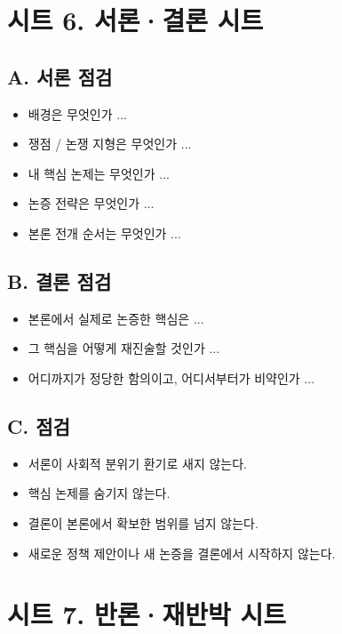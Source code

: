 \section{시트 6. 서론·결론 시트}\label{uxc2dcuxd2b8-6-uxc11cuxb860uxacb0uxb860-uxc2dcuxd2b8}

\subsection{A. 서론 점검}\label{a-uxc11cuxb860-uxc810uxac80}

\begin{itemize}
\tightlist
\item
  배경은 무엇인가 ...
\item
  쟁점 / 논쟁 지형은 무엇인가 ...
\item
  내 핵심 논제는 무엇인가 ...
\item
  논증 전략은 무엇인가 ...
\item
  본론 전개 순서는 무엇인가 ...
\end{itemize}

\subsection{B. 결론 점검}\label{b-uxacb0uxb860-uxc810uxac80}

\begin{itemize}
\tightlist
\item
  본론에서 실제로 논증한 핵심은 ...
\item
  그 핵심을 어떻게 재진술할 것인가 ...
\item
  어디까지가 정당한 함의이고, 어디서부터가 비약인가 ...
\end{itemize}

\subsection{C. 점검}\label{c-uxc810uxac80-1}

\begin{itemize}
\tightlist
\item[$\square$]
  서론이 사회적 분위기 환기로 새지 않는다.
\item[$\square$]
  핵심 논제를 숨기지 않는다.
\item[$\square$]
  결론이 본론에서 확보한 범위를 넘지 않는다.
\item[$\square$]
  새로운 정책 제안이나 새 논증을 결론에서 시작하지 않는다.
\end{itemize}

\section{시트 7. 반론·재반박 시트}\label{uxc2dcuxd2b8-7-uxbc18uxb860uxc7acuxbc18uxbc15-uxc2dcuxd2b8}

